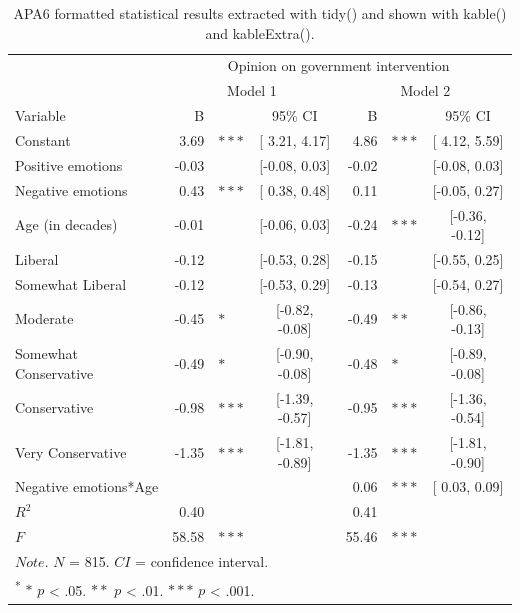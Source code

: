 \documentclass[doc,floatsintext]{apa6}
\begin{document}
\begin{table}[H]

\caption{\label{tab:regressiontablecustom2}APA6 formatted statistical results extracted with tidy() and 
                 shown with kable() and kableExtra().}
\centering
\begin{tabular}[t]{lrlcrlc}
\toprule
\multicolumn{1}{c}{ } & \multicolumn{6}{c}{Opinion on government intervention} \\
\cmidrule(l{3pt}r{3pt}){2-7}
\multicolumn{1}{c}{ } & \multicolumn{3}{c}{Model 1} & \multicolumn{3}{c}{Model 2} \\
\cmidrule(l{3pt}r{3pt}){2-4} \cmidrule(l{3pt}r{3pt}){5-7}
Variable & B &  & 95\% CI & B &  & 95\% CI\\
\midrule
Constant & 3.69 & $***$ & [ 3.21,  4.17] & 4.86 & $***$ & [ 4.12,  5.59]\\
Positive emotions & -0.03 &  & [-0.08,  0.03] & -0.02 &  & [-0.08,  0.03]\\
Negative emotions & 0.43 & $***$ & [ 0.38,  0.48] & 0.11 &  & [-0.05,  0.27]\\
Age (in decades) & -0.01 &  & [-0.06,  0.03] & -0.24 & $***$ & [-0.36, -0.12]\\
Liberal & -0.12 &  & [-0.53,  0.28] & -0.15 &  & [-0.55,  0.25]\\
\addlinespace
Somewhat Liberal & -0.12 &  & [-0.53,  0.29] & -0.13 &  & [-0.54,  0.27]\\
Moderate & -0.45 & $*$ & [-0.82, -0.08] & -0.49 & $**$ & [-0.86, -0.13]\\
Somewhat Conservative & -0.49 & $*$ & [-0.90, -0.08] & -0.48 & $*$ & [-0.89, -0.08]\\
Conservative & -0.98 & $***$ & [-1.39, -0.57] & -0.95 & $***$ & [-1.36, -0.54]\\
Very Conservative & -1.35 & $***$ & [-1.81, -0.89] & -1.35 & $***$ & [-1.81, -0.90]\\
\addlinespace
Negative emotions*Age &  &  &  & 0.06 & $***$ & [ 0.03,  0.09]\\
$R^2$ & 0.40 &  &  & 0.41 &  & \\
$F$ & 58.58 & $***$ &  & 55.46 & $***$ & \\
\bottomrule
\multicolumn{7}{l}{$Note$. $N$ = 815. $CI$ = confidence interval.}\\
\multicolumn{7}{l}{\textsuperscript{*} $*$ $p$ < .05. $**$ $p$ < .01. $***$ $p$ < .001.}\\
\end{tabular}
\end{table}
\end{document}
